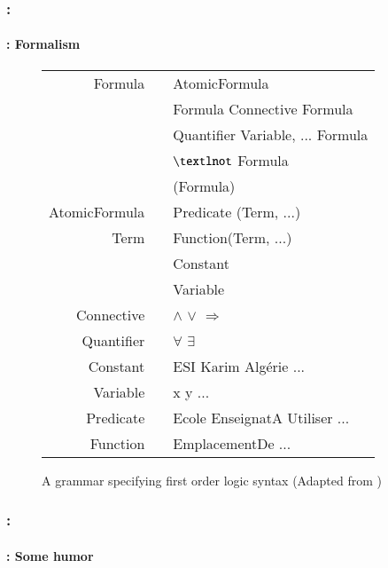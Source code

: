 \documentclass[xcolor=table]{beamer}
\begin{document}
\begin{frame}
	\frametitle{\insertshortsubtitle: \insertsection}
	\framesubtitle{\insertsubsection: Formalism}
	
	\begin{figure}
		\scriptsize
		\begin{tabular}{rcl}
			\hline\hline
			Formula & \textrightarrow & AtomicFormula \\
			        & \textbar        & Formula Connective Formula \\
			        & \textbar        & Quantifier Variable, ... Formula \\
			        & \textbar        & $\textlnot$ Formula \\
			        & \textbar        & (Formula) \\
			AtomicFormula & \textrightarrow & Predicate (Term, ...) \\
			Term    & \textrightarrow & Function(Term, ...) \\
			        & \textbar        & Constant \\
			        & \textbar        & Variable \\
			Connective & \textrightarrow & $\wedge$ \textbar $\vee$ \textbar $\Rightarrow$ \\
			Quantifier & \textrightarrow & $\forall$ \textbar $\exists$ \\
			Constant & \textrightarrow & ESI \textbar Karim \textbar Algérie ...\\
			Variable & \textrightarrow & x \textbar y \textbar ... \\
			Predicate & \textrightarrow & Ecole \textbar EnseignatA \textbar Utiliser \textbar ... \\
			Function & \textrightarrow & EmplacementDe \textbar ... \\
			\hline\hline
		\end{tabular}
		\caption{A grammar specifying first order logic syntax \cite{2019-jurafsky-martin} (Adapted from \cite{2002-russell-norvig})}
	\end{figure}
	
\end{frame}

\begin{frame}
	\frametitle{\insertshortsubtitle: \insertsection}
	\framesubtitle{\insertsubsection: Some humor}
	
	\begin{center}
	\end{center}
	
\end{frame}
\end{document}
